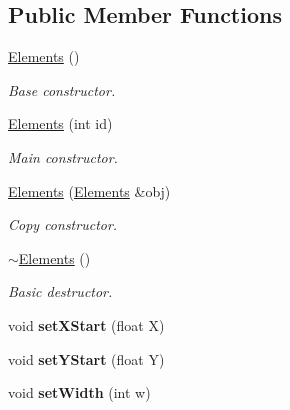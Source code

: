 \subsection*{Public Member Functions}
\begin{DoxyCompactItemize}
\item 
\hypertarget{class_elements_aaf76c70282b6997fc20f1d8c751d7146}{\hyperlink{class_elements_aaf76c70282b6997fc20f1d8c751d7146}{Elements} ()}\label{class_elements_aaf76c70282b6997fc20f1d8c751d7146}

\begin{DoxyCompactList}\small\item\em Base constructor. \end{DoxyCompactList}\item 
\hyperlink{class_elements_a15505a7088b59b169943cf0b3883d859}{Elements} (int id)
\begin{DoxyCompactList}\small\item\em Main constructor. \end{DoxyCompactList}\item 
\hyperlink{class_elements_a2a0658f7634191593c7d6eeab1556adc}{Elements} (\hyperlink{class_elements}{Elements} \&obj)
\begin{DoxyCompactList}\small\item\em Copy constructor. \end{DoxyCompactList}\item 
\hypertarget{class_elements_a28037b21a12317e69d6160da9f4844de}{\hyperlink{class_elements_a28037b21a12317e69d6160da9f4844de}{$\sim$\+Elements} ()}\label{class_elements_a28037b21a12317e69d6160da9f4844de}

\begin{DoxyCompactList}\small\item\em Basic destructor. \end{DoxyCompactList}\item 
\hypertarget{class_elements_a23add0eda070fb51f84eab6b94d5b886}{void {\bfseries set\+X\+Start} (float X)}\label{class_elements_a23add0eda070fb51f84eab6b94d5b886}

\item 
\hypertarget{class_elements_a2214c37dc1288a3763db6780bf7d6ee5}{void {\bfseries set\+Y\+Start} (float Y)}\label{class_elements_a2214c37dc1288a3763db6780bf7d6ee5}

\item 
\hypertarget{class_elements_a16f6accfe5a20c996dae8154132e4bf7}{void {\bfseries set\+Width} (int w)}\label{class_elements_a16f6accfe5a20c996dae8154132e4bf7}


\end{DoxyCompactItemize}
